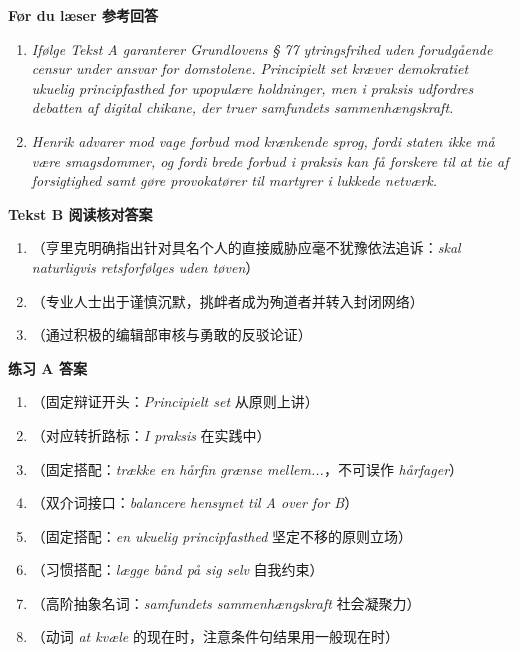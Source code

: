 \begin{answerbox}
\textbf{Før du læser 参考回答}
\begin{enumerate}
  \item \textit{Ifølge Tekst A garanterer Grundlovens § 77 ytringsfrihed uden forudgående censur under ansvar for domstolene. Principielt set kræver demokratiet ukuelig principfasthed for upopulære holdninger, men i praksis udfordres debatten af digital chikane, der truer samfundets sammenhængskraft.}
  \item \textit{Henrik advarer mod vage forbud mod krænkende sprog, fordi staten ikke må være smagsdommer, og fordi brede forbud i praksis kan få forskere til at tie af forsigtighed samt gøre provokatører til martyrer i lukkede netværk.}
\end{enumerate}

\textbf{Tekst B 阅读核对答案}
\begin{enumerate}
  \item {}（亨里克明确指出针对具名个人的直接威胁应毫不犹豫依法追诉：\textit{skal naturligvis retsforfølges uden tøven}）
  \item {}（专业人士出于谨慎沉默，挑衅者成为殉道者并转入封闭网络）
  \item {}（通过积极的编辑部审核与勇敢的反驳论证）
\end{enumerate}

\textbf{练习 A 答案}
\begin{enumerate}
  \item {}（固定辩证开头：\textit{Principielt set} 从原则上讲）
  \item {}（对应转折路标：\textit{I praksis} 在实践中）
  \item {}（固定搭配：\textit{trække en hårfin grænse mellem...}，不可误作 \textit{hårfager}）
  \item {}（双介词接口：\textit{balancere hensynet til A over for B}）
  \item {}（固定搭配：\textit{en ukuelig principfasthed} 坚定不移的原则立场）
  \item {}（习惯搭配：\textit{lægge bånd på sig selv} 自我约束）
  \item {}（高阶抽象名词：\textit{samfundets sammenhængskraft} 社会凝聚力）
  \item {}（动词 \textit{at kvæle} 的现在时，注意条件句结果用一般现在时）
\end{enumerate}


\end{answerbox}
